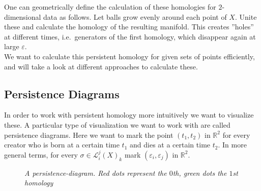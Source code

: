 \documentclass[11pt, a4paper,draft]{report}
\newcommand{\bR}{\mathbb{R}}
\begin{document}
    One can geometrically define the calculation of these homologies for $2$-dimensional data as follows.
    Let balls grow evenly around each point of $X$.
    Unite these and calculate the homology of the resulting manifold.
    This creates ''holes'' at different times, i.e.\ generators of the first homology, which disappear again at large $\varepsilon$.\\ We want to calculate this persistent homology for given sets of points efficiently, and will take a look at different approaches to calculate these.
    \subsection{Persistence Diagrams}\label{subsec:persistence-diagrams}

    In order to work with persistent homology more intuitively we want to visualize these.
    A particular type of visualization we want to work with are called persistence diagrams.
    Here we want to mark the point $(t_1,t_2)$ in $\bR^2$ for every creator who is born at a certain time $t_1$ and dies at a certain time $t_2$.
    In more general terms, for every $\sigma\in\mathcal{L}_i^j(X)_k$ mark $(\varepsilon_i,\varepsilon_j)$ in $\bR^2$.\\
    \begin{figure}
        \centering
        \caption{\textit{A persistence-diagram.
        Red dots represent the $0$th, green dots the $1$st homology}}
        \label{fig2}
    \end{figure}
\end{document}
